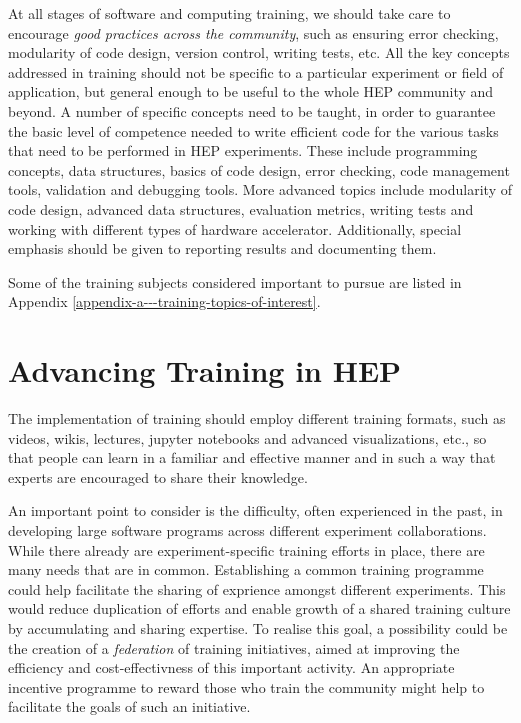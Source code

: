 \documentclass[12pt,a4paper]{article}
\begin{document}
At all stages of software and computing training, we should take care to
encourage \emph{good practices across the community}, such as ensuring error
checking, modularity of code design, version control, writing tests, etc. All
the key concepts addressed in training should not be specific to a particular
experiment or field of application, but general enough to be useful to the whole
HEP community and beyond. A number of specific concepts need to be taught, in
order to guarantee the basic level of competence needed to write efficient code
for the various tasks that need to be performed in HEP experiments.
These include
programming concepts, data structures, basics of code design, error checking,
code management tools, validation and debugging tools. More advanced topics
include modularity of code design, advanced data structures, evaluation metrics,
writing tests and working with different types of hardware accelerator.
Additionally, special emphasis should be given to
reporting results and documenting them.

Some of the training subjects considered important to pursue are
listed in Appendix \ref{appendix-a---training-topics-of-interest}.


\section{Advancing Training in HEP}

The implementation of training should employ different training formats, such as
videos, wikis, lectures, jupyter notebooks and advanced visualizations, etc.,
so that people can learn in a familiar and effective manner and in such a way
that experts are encouraged to share their knowledge.

An important point to consider is the difficulty, often experienced in the past,
in developing large software programs across different experiment
collaborations.
While there already are experiment-specific training efforts in place, there are
many needs that are in common. Establishing a common training programme could
help facilitate the sharing of exprience amongst different experiments. This
would reduce duplication of efforts and enable growth of a shared training
culture by accumulating and sharing expertise.
To realise this goal, a possibility could be the creation of a 
\emph{federation} of training initiatives,
aimed at improving the efficiency and cost-effectivness of this important
activity. An appropriate incentive programme to reward those who train the community 
might help to facilitate the goals of such an initiative.
\end{document}

